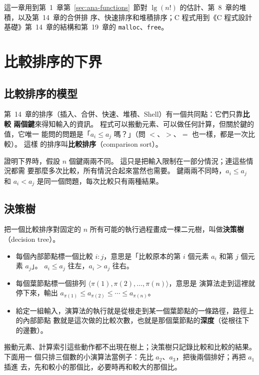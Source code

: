 這一章用到第~1~章第~\ref{sec:ana-functions}~節對 $\lg(n!)$ 的估計、第~8~章的堆積，以及第~14~章的合併排
序、快速排序和堆積排序；C 程式用到《C 程式設計基礎》第~14~章的結構和第~19~章的
\texttt{malloc}、\texttt{free}。

\section{比較排序的下界}
\label{sec:lin-lower}

\subsection{比較排序的模型}

第~14~章的排序（插入、合併、快速、堆積、Shell）有一個共同點：它們只靠\textbf{比較
兩個鍵}來得知輸入的資訊。 程式可以搬動元素、可以做任何計算，但關於鍵的值，它唯一
能問的問題是「$a_i \le a_j$ 嗎？」（問 $<$、$>$、$=$ 也一樣，都是一次比較）。 這樣
的排序叫\textbf{比較排序}（comparison sort）。

證明下界時，假設 $n$ 個鍵兩兩不同。 這只是把輸入限制在一部分情況；連這些情況都需
要那麼多次比較，所有情況合起來當然也需要。 鍵兩兩不同時，$a_i \le a_j$ 和
$a_i < a_j$ 是同一個問題，每次比較只有兩種結果。

\subsection{決策樹}

把一個比較排序對固定的 $n$ 所有可能的執行過程畫成一棵二元樹，叫做\textbf{決策樹}
（decision tree）。
\begin{itemize}
\item 每個內部節點標一個比較 $i{:}j$，意思是「比較原本的第 $i$ 個元素 $a_i$ 和第
$j$ 個元素 $a_j$」。 $a_i \le a_j$ 往左，$a_i > a_j$ 往右。
\item 每個葉節點標一個排列 $\langle \pi(1), \pi(2), \ldots, \pi(n) \rangle$，意思是
演算法走到這裡就停下來，輸出 $a_{\pi(1)} \le a_{\pi(2)} \le \cdots \le a_{\pi(n)}$。
\item 給定一組輸入，演算法的執行就是從根走到某一個葉節點的一條路徑，路徑上的內部節點
數就是這次做的比較次數，也就是那個葉節點的\textbf{深度}（從根往下的邊數）。
\end{itemize}

搬動元素、計算索引這些動作都不出現在樹上；決策樹只記錄比較和比較的結果。 下面用一
個只排三個數的小演算法當例子：先比 $a_2$、$a_3$，把後兩個排好；再把 $a_1$ 插進
去，先和較小的那個比，必要時再和較大的那個比。

